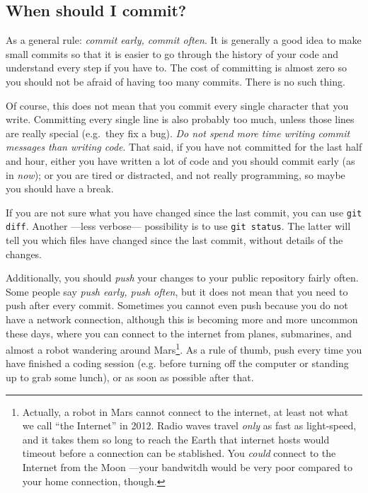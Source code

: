 \subsection{When should I commit?}
\label{sec:when-should-i}

As a general rule: \emph{commit early, commit often}. It is generally
a good idea to make small commits so that it is easier to go through
the history of your code and understand every step if you have to. The
cost of 
committing is almost zero so you should not be afraid of having too
many commits. There is no such thing. 

Of course, this does not mean that you commit every single character
that you write. Committing every single line is also probably too
much, unless those lines are really special (e.g.~they fix a bug). 
\emph{Do not spend more time
writing commit messages than writing code}. That said, if you have not
committed for the last half and hour, either you have written a lot of
code and you should commit early (as in \emph{now}); or you are tired
or distracted, and not really programming, so maybe you should have a
break.

If you are not sure what you have changed since the last commit, 
you can use \verb+git diff+. Another ---less verbose--- possibility
is to use \verb+git status+. The latter will tell you
which files have changed since the last commit, without details of the
changes.

Additionally, you should \emph{push} your changes to your public
repository fairly often. Some people say \emph{push early, push
  often}, but it does not mean that you need to push after every
commit. Sometimes 
you cannot even push because you do not have a network connection,
although this is becoming more and more uncommon these days, where you
can connect to the internet from planes, submarines, and almost a
robot wandering around Mars\footnote{Actually, a robot in Mars cannot
  connect to the internet, at least not what we call ``the Internet'' in
  2012. Radio waves travel \emph{only} as fast as light-speed, and it
  takes them so long to reach the Earth that internet hosts would
  timeout before a connection can be stablished. You \emph{could} connect to
  the Internet from the Moon ---your bandwitdh would be
  very poor compared to your home connection, though.}. 
As a rule of thumb, push every time you 
have finished a coding session (e.g. before turning off the computer
or standing up to grab some lunch), or as soon as possible after that.


